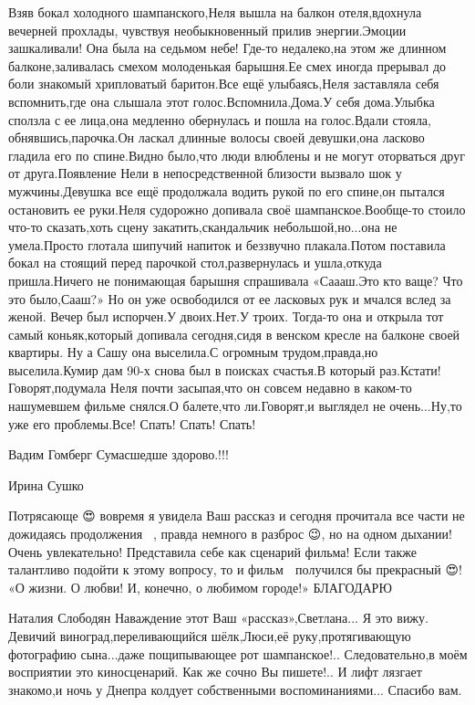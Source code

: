 Взяв бокал холодного шампанского,Неля вышла на балкон отеля,вдохнула вечерней прохлады, чувствуя необыкновенный прилив энергии.Эмоции зашкаливали! Она была на седьмом небе! Где-то недалеко,на этом же длинном балконе,заливалась смехом молоденькая барышня.Ее смех иногда прерывал до боли знакомый хрипловатый баритон.Все ещё улыбаясь,Неля заставляла себя вспомнить,где она слышала этот голос.Вспомнила.Дома.У себя дома.Улыбка сползла с ее лица,она медленно обернулась и пошла на голос.Вдали стояла, обнявшись,парочка.Он ласкал длинные волосы своей девушки,она ласково гладила его по спине.Видно было,что люди влюблены и не могут оторваться друг от друга.Появление Нели в непосредственной близости вызвало шок у мужчины.Девушка все ещё продолжала водить рукой по его спине,он пытался остановить ее руки.Неля судорожно допивала своё шампанское.Вообще-то стоило что-то сказать,хоть сцену закатить,скандальчик небольшой,но...она не умела.Просто глотала шипучий напиток и беззвучно плакала.Потом поставила бокал на стоящий перед парочкой стол,развернулась и ушла,откуда пришла.Ничего не понимающая барышня спрашивала «Саааш.Это кто ваще? Что это было,Сааш?» Но он уже освободился от ее ласковых рук и мчался вслед за женой.
Вечер был испорчен.У двоих.Нет.У троих.
Тогда-то она и открыла тот самый коньяк,который допивала сегодня,сидя в венском кресле на балконе своей квартиры.
Ну а Сашу она выселила.С огромным трудом,правда,но выселила.Кумир дам 90-х снова был в поисках счастья.В который раз.Кстати! Говорят,подумала Неля почти засыпая,что он совсем недавно в каком-то нашумевшем фильме снялся.О балете,что ли.Говорят,и выглядел не очень...Ну,то уже его проблемы.Все! Спать! Спать! Спать!

Вадим Гомберг
Сумасшедше здорово.!!!

Ирина Сушко

Потрясающе 😍 вовремя я увидела Ваш рассказ и сегодня прочитала все части не дожидаясь продолжения👍🏻😍, правда немного в разброс 😉, но на одном дыхании! Очень увлекательно! Представила себе как сценарий фильма! Если также талантливо подойти к этому вопросу, то и фильм 🎥 получился бы прекрасный 😍! «О жизни. О любви! И, конечно, о любимом городе!»
БЛАГОДАРЮ

Наталия Слободян
Наваждение этот Ваш «рассказ»,Светлана...
Я это вижу.
Девичий виноград,переливающийся шёлк,Люси,её руку,протягивающую фотографию сына...даже пощипывающее рот шампанское!..
Следовательно,в моём восприятии это киносценарий.
Как же сочно Вы пишете!..
И лифт лязгает знакомо,и ночь у Днепра колдует собственными воспоминаниями...
Спасибо вам.
